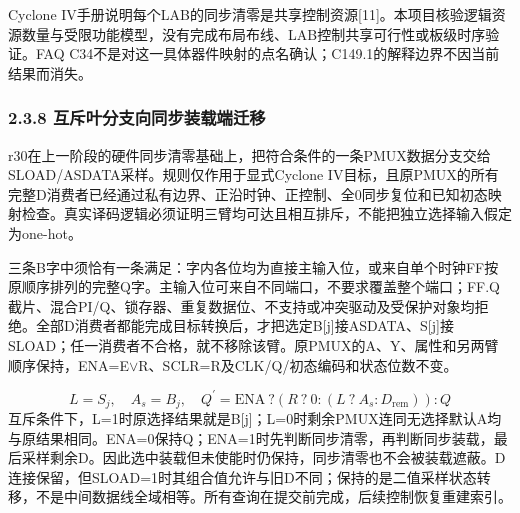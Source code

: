 \documentclass[UTF8,fontset=fandol,12pt]{ctexart}
\begin{document}
Cyclone IV手册说明每个LAB的同步清零是共享控制资源[11]。本项目核验逻辑资源数量与受限功能模型，没有完成布局布线、LAB控制共享可行性或板级时序验证。FAQ C34不是对这一具体器件映射的点名确认；C149.1的解释边界不因当前结果而消失。

\Needspace{129.6pt}\subsubsection*{2.3.8  互斥叶分支向同步装载端迁移}
r30在上一阶段的硬件同步清零基础上，把符合条件的一条PMUX数据分支交给SLOAD/\allowbreak{}ASDATA采样。规则仅作用于显式Cyclone IV目标，且原PMUX的所有完整D消费者已经通过私有边界、正沿时钟、正控制、全0同步复位和已知初态映射检查。真实译码逻辑必须证明三臂均可达且相互排斥，不能把独立选择输入假定为one-hot。

三条B字中须恰有一条满足：字内各位均为直接主输入位，或来自单个时钟FF按原顺序排列的完整Q字。主输入位可来自不同端口，不要求覆盖整个端口；FF.Q截片、混合PI/\allowbreak{}Q、锁存器、重复数据位、不支持或冲突驱动及受保护对象均拒绝。全部D消费者都能完成目标转换后，才把选定B[j]接ASDATA、S[j]接SLOAD；任一消费者不合格，就不移除该臂。原PMUX的A、Y、属性和另两臂顺序保持，ENA=E\ensuremath{\lor}R、SCLR=R及CLK/\allowbreak{}Q/\allowbreak{}初态编码和状态位数不变。

\[
L=S_j,\quad A_s=B_j,\quad Q^{\prime}=\mathrm{ENA}\ ?(R\ ?\ 0:(L\ ?\ A_s:D_{\mathrm{rem}})):Q
\]
互斥条件下，L=1时原选择结果就是B[j]；L=0时剩余PMUX连同无选择默认A均与原结果相同。ENA=0保持Q；ENA=1时先判断同步清零，再判断同步装载，最后采样剩余D。因此选中装载但未使能时仍保持，同步清零也不会被装载遮蔽。D连接保留，但SLOAD=1时其组合值允许与旧D不同；保持的是二值采样状态转移，不是中间数据线全域相等。所有查询在提交前完成，后续控制恢复重建索引。
\end{document}
